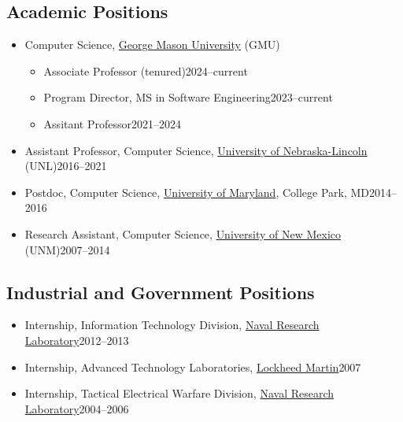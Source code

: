 \documentclass[11pt]{article}
\begin{document}
    \subsection{Academic Positions}

    \begin{itemize}
      \item Computer Science, \href{https://cs.gmu.edu}{George Mason University} (GMU)
            \begin{itemize}
              \item Associate Professor (tenured)\hfill 2024--current
              \item Program Director, MS in Software Engineering\hfill 2023--current
              \item Assitant Professor\hfill 2021--2024

            \end{itemize}

      \item Assistant Professor, Computer Science, \href{https://computing.unl.edu}{University of Nebraska-Lincoln} (UNL)\hfill 2016--2021

      \item Postdoc, Computer Science,  \href{https://www.umd.edu}{University of Maryland}, College Park, MD\hfill 2014--2016

      \item Research Assistant, Computer Science, \href{https://www.cs.unm.edu}{University of New Mexico} (UNM)\hfill 2007--2014

    \end{itemize}

    \subsection{Industrial and Government Positions}
    \begin{itemize}
      \item Internship, Information Technology Division, \href{https://www.nrl.navy.mil}{Naval Research Laboratory}\hfill 2012--2013
      \item Internship, Advanced Technology Laboratories, \href{https://lockheedmartin.com/en-us/capabilities/research-labs/advanced-technology-labs.html}{Lockheed Martin}\hfill 2007
      \item Internship, Tactical Electrical Warfare Division,  \href{https://www.nrl.navy.mil}{Naval Research Laboratory}\hfill 2004--2006
    \end{itemize}
\end{document}
